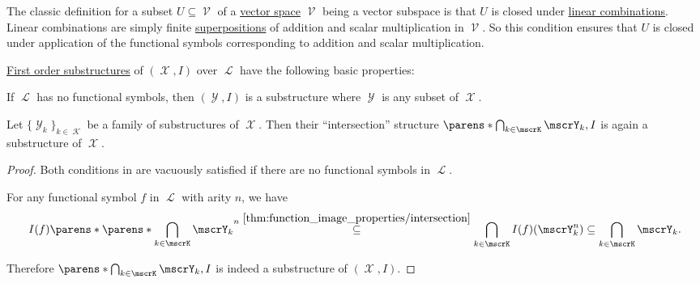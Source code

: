 \begin{example}\label{ex:def:first_order_substructure/vector_space}
  The classic definition for a subset \( U \subseteq \mscrV \) of a \hyperref[def:vector_space]{vector space} \( \mscrV \) being a vector subspace is that \( U \) is closed under \hyperref[def:linear_combination]{linear combinations}. Linear combinations are simply finite \hyperref[def:function/superposition]{superpositions} of addition and scalar multiplication in \( \mscrV \). So this condition ensures that \( U \) is closed under application of the functional symbols corresponding to addition and scalar multiplication.
\end{example}

\begin{proposition}\label{thm:first_order_substructure_properties}
  \hyperref[def:first_order_substructure]{First order substructures} of \( (\mscrX, I) \) over \( \mscrL \) have the following basic properties:
  \begin{thmenum}
     If \( \mscrL \) has no functional symbols, then \( (\mscrY, I) \) is a substructure where \( \mscrY \) is any subset of \( \mscrX \).

     Let \( \{ \mscrY_k \}_{k \in \mscrK} \) be a family of substructures of \( \mscrX \). Then their \enquote{intersection} structure \( \parens*{\bigcap_{k \in \mscrK} \mscrY_k, I} \) is again a substructure of \( \mscrX \).
  \end{thmenum}
\end{proposition}
\begin{proof}
   Both conditions in  are vacuously satisfied if there are no functional symbols in \( \mscrL \).

   For any functional symbol \( f \) in \( \mscrL \) with arity \( n \), we have
  \begin{equation*}
    I(f)\parens*{\parens*{\bigcap_{\smash{k \in \mscrK}} \mscrY_k}^n}
    \overset {\ref{thm:function_image_properties/intersection}} \subseteq
    \bigcap_{k \in \mscrK} I(f)(\mscrY_k^n) \subseteq \bigcap_{k \in \mscrK} \mscrY_k.
  \end{equation*}

  Therefore \( \parens*{\bigcap_{k \in \mscrK} \mscrY_k, I} \) is indeed a substructure of \( (\mscrX, I) \).
\end{proof}

